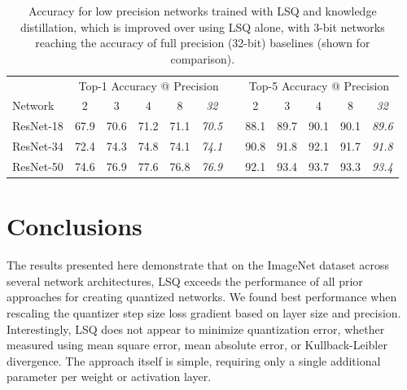 \documentclass{article}
\begin{document}
\begin{table}[h]
	\caption{Accuracy for low precision networks trained with LSQ and knowledge distillation, which is improved over using LSQ alone, with 3-bit networks reaching the accuracy of full precision (32-bit) baselines (shown for comparison).}
	\label{table:kd}
	\setlength\tabcolsep{6pt}
	\begin{center}
	\small
	\begin{tabular}{l ccccc c ccccc}
		\toprule
		& \multicolumn{5}{c}{Top-1 Accuracy @ Precision} & & \multicolumn{5}{c}{Top-5 Accuracy @ Precision} \\
		Network  & 2 & 3 & 4 & 8 & \textit{32} & & 2 & 3 & 4 & 8 & \textit{32}\\
		\midrule
		ResNet-18 	& 67.9	& 70.6	& 71.2	& 71.1	& \textit{70.5}	& 	& 88.1	& 89.7	& 90.1	& 90.1	& \textit{89.6} \\
		ResNet-34 	& 72.4	& 74.3	& 74.8	& 74.1	& \textit{74.1}	&	& 90.8	& 91.8	& 92.1	& 91.7 	& \textit{91.8} \\		
		ResNet-50 	& 74.6	& 76.9	& 77.6	& 76.8	& \textit{76.9}	& 	& 92.1	& 93.4	& 93.7	& 93.3 	& \textit{93.4} \\				
		\bottomrule
	\end{tabular}
	\end{center}
\end{table}









\section{Conclusions}

The results presented here demonstrate that on the ImageNet dataset across several network architectures, LSQ exceeds the performance of all prior approaches for creating quantized networks.
%
We found best performance when rescaling the quantizer step size loss gradient based on layer size and precision.
%
Interestingly, LSQ does not appear to minimize quantization error, whether measured using mean square error, mean absolute error, or Kullback-Leibler divergence.
%
The approach itself is simple, requiring only a single additional parameter per weight or activation layer.
\end{document}
